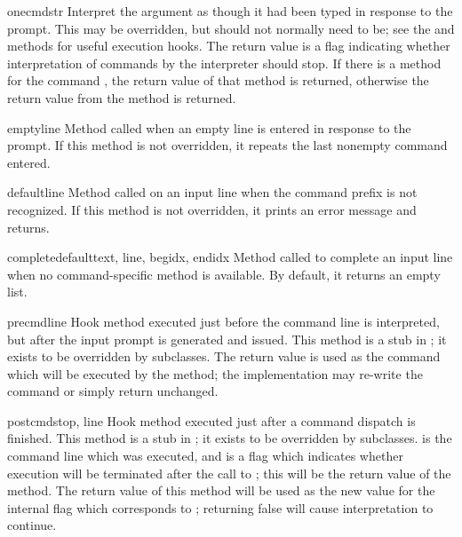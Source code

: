 \begin{methoddesc}[Cmd]{onecmd}{str}
Interpret the argument as though it had been typed in response to the
prompt.  This may be overridden, but should not normally need to be;
see the  and  methods for useful
execution hooks.  The return value is a flag indicating whether
interpretation of commands by the interpreter should stop.  If there
is a  method for the command , the return
value of that method is returned, otherwise the return value from the
 method is returned.
\end{methoddesc}

\begin{methoddesc}[Cmd]{emptyline}{}
Method called when an empty line is entered in response to the prompt.
If this method is not overridden, it repeats the last nonempty command
entered.  
\end{methoddesc}

\begin{methoddesc}[Cmd]{default}{line}
Method called on an input line when the command prefix is not
recognized. If this method is not overridden, it prints an
error message and returns.
\end{methoddesc}

\begin{methoddesc}[Cmd]{completedefault}{text, line, begidx, endidx}
Method called to complete an input line when no command-specific
 method is available.  By default, it returns an
empty list.
\end{methoddesc}

\begin{methoddesc}[Cmd]{precmd}{line}
Hook method executed just before the command line  is
interpreted, but after the input prompt is generated and issued.  This
method is a stub in ; it exists to be overridden by
subclasses.  The return value is used as the command which will be
executed by the  method; the 
implementation may re-write the command or simply return 
unchanged.
\end{methoddesc}

\begin{methoddesc}[Cmd]{postcmd}{stop, line}
Hook method executed just after a command dispatch is finished.  This
method is a stub in ; it exists to be overridden by
subclasses.   is the command line which was executed, and
 is a flag which indicates whether execution will be
terminated after the call to ; this will be the
return value of the  method.  The return value of
this method will be used as the new value for the internal flag which
corresponds to ; returning false will cause interpretation
to continue.
\end{methoddesc}

